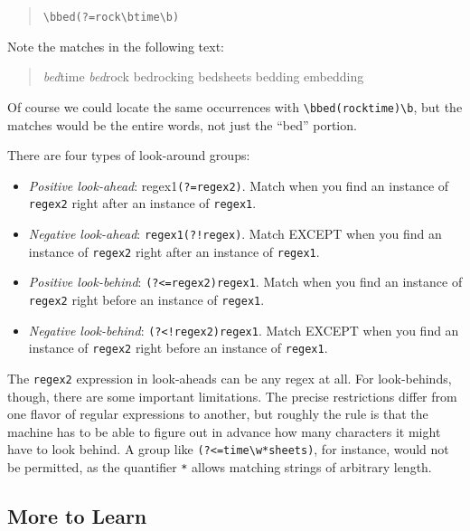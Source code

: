 \documentclass[]{book}
\providecommand{\tightlist}{%
  \setlength{\itemsep}{0pt}\setlength{\parskip}{0pt}}
\theoremstyle{definition}
\theoremstyle{definition}
\theoremstyle{remark}
\begin{document}
{\begin{quote}
\texttt{\textbackslash{}bbed(?=rock\textbackslash{}b\textbar{}time\textbackslash{}b)}
\end{quote}

Note the matches in the following text:

\begin{quote}
\emph{bed}time \emph{bed}rock bedrocking bedsheets bedding embedding
\end{quote}

Of course we could locate the same occurrences with
\texttt{\textbackslash{}bbed(rock\textbar{}time)\textbackslash{}b}, but
the matches would be the entire words, not just the ``bed'' portion.

There are four types of look-around groups: 

\begin{itemize}
\tightlist
\item
  \emph{Positive look-ahead}: regex1\texttt{(?=regex2)}. Match when you
  find an instance of \texttt{regex2} right after an instance of
  \texttt{regex1}.
\item
  \emph{Negative look-ahead}: \texttt{regex1(?!regex)}. Match EXCEPT
  when you find an instance of \texttt{regex2} right after an instance
  of \texttt{regex1}.
\item
  \emph{Positive look-behind}: \texttt{(?\textless{}=regex2)regex1}.
  Match when you find an instance of \texttt{regex2} right before an
  instance of \texttt{regex1}.
\item
  \emph{Negative look-behind}: \texttt{(?\textless{}!regex2)regex1}.
  Match EXCEPT when you find an instance of \texttt{regex2} right before
  an instance of \texttt{regex1}.
\end{itemize}

The \texttt{regex2} expression in look-aheads can be any regex at all.
For look-behinds, though, there are some important limitations. The
precise restrictions differ from one flavor of regular expressions to
another, but roughly the rule is that the machine has to be able to
figure out in advance how many characters it might have to look behind.
A group like \texttt{(?\textless{}=time\textbackslash{}w*sheets)}, for
instance, would not be permitted, as the quantifier \texttt{*} allows
matching strings of arbitrary length.

\subsection{More to Learn}\label{more-to-learn-1}

}
\end{document}
